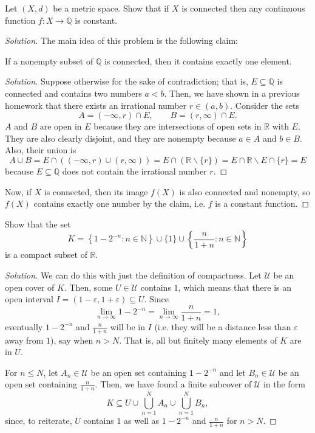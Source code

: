 \documentclass[11pt]{scrartcl}
\providecommand{\eps}{\varepsilon}
\providecommand{\NN}{\mathbb N}
\providecommand{\QQ}{\mathbb Q}
\providecommand{\RR}{\mathbb R}
\providecommand{\setdiff}{\smallsetminus}
\newenvironment{soln}{\begin{proof}[Solution]}{\end{proof}}
\begin{document}
\pagebreak
\begin{problem}
	Let $(X, d)$ be a metric space. Show that if $X$ is connected
	then any continuous function $f\colon X\to\QQ$ is constant.
\end{problem}

\begin{soln}
	The main idea of this problem is the following claim:
	\begin{claim}
		If a nonempty subset of $\QQ$ is connected, then it contains
		exactly one element.
	\end{claim}
	\begin{soln}
		Suppose otherwise for the sake of contradiction;
		that is, $E\subseteq\QQ$ is connected and contains
		two numbers $a < b$. Then, we have shown in a previous homework that
		there exists an irrational number $r\in(a, b)$.
		Consider the sets
		\[A = (-\infty, r)\cap E,\qquad
		B = (r,\infty)\cap E.\]
		$A$ and $B$ are open in $E$ because they are intersections
		of open sets in $\RR$ with $E$.
		They are also clearly disjoint,
		and they are nonempty because $a\in A$ and $b\in B$.
		Also, their union is
		\[A\cup B = E\cap((-\infty,r)\cup(r,\infty))
		= E\cap(\RR\setdiff\{r\})
		= E\cap\RR \setdiff E\cap\{r\}
		= E\]
		because $E\subseteq\QQ$ does not contain the irrational number $r$.
	\end{soln}

	Now, if $X$ is connected, then its image $f(X)$ is also connected
	and nonempty, so $f(X)$ contains exactly one number by the claim,
	i.e. $f$ is a constant function.
\end{soln}

\pagebreak
\begin{problem}
	Show that the set
	\[K = \left\{1 - 2^{-n} : n\in\NN\right\}
	\cup\{1\}\cup \left\{\frac{n}{1+n} : n\in\NN\right\}\]
	is a compact subset of $\RR$.
\end{problem}

\begin{soln}
	We can do this with just the definition of compactness.
	Let $\mathcal U$ be an open cover of $K$.
	Then, some $U\in \mathcal U$ contains $1$, which means that
	there is an open interval $I = (1-\eps,1+\eps)\subseteq U$. Since
	\[\lim_{n\to\infty} 1 - 2^{-n} = \lim_{n\to\infty} \frac{n}{1 + n} = 1,\]
	eventually $1 - 2^{-n}$ and $\frac{n}{1 + n}$ will be in $I$
	(i.e. they will be a distance less than $\eps$ away from $1$),
	say when $n > N$.
	That is, all but finitely many elements of $K$ are in $U$.
	
	For $n \le N$, let $A_n\in\mathcal U$ be an open set containing $1 - 2^{-n}$
	and let $B_n\in\mathcal U$ be an open set containing $\frac{n}{1+n}$.
	Then, we have found a finite subcover of $\mathcal U$ in the form
	\[K \subseteq U \cup \bigcup_{n=1}^N A_n \cup\bigcup_{n=1}^N B_n,\]
	since, to reiterate, $U$ contains $1$ as well as
	$1 - 2^{-n}$ and $\frac{n}{1+n}$ for $n > N$.
\end{soln}
\end{document}
